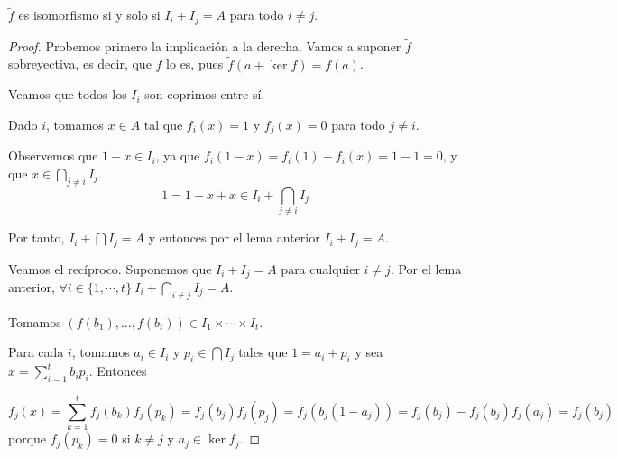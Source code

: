 \begin{teo}
  \(\tilde{f}\) es isomorfismo si y solo si
  \(I_i+I_j=A\) para todo \(i\neq j\).
\end{teo}
\begin{proof}
  Probemos primero la implicación a la derecha. Vamos a suponer \(\tilde{f}\) sobreyectiva, es decir, que \(f\) lo es, 
  pues \(\tilde{f}(a + \ker{f}) = f(a)\).
  
  Veamos que todos los \(I_i\) son coprimos entre sí.

  Dado \(i\), tomamos \(x\in A\) tal que \(f_i(x)=1\) y
  \(f_j(x)=0\) para todo \(j\neq i\).

  Observemos que \(1-x\in I_i\), ya que \(f_i(1-x) = f_i(1) - f_i(x) = 
  1 - 1 = 0\), y que \(x\in\bigcap_{j\neq i} I_j\).
  \[
    1=1-x+x \in I_i+\bigcap_{j\neq i} I_j
  \]

  Por tanto, \(I_i+\bigcap I_j =A\) y entonces por el lema anterior
  \(I_i+I_j=A\).
  
  Veamos el recíproco.
  Suponemos que \(I_i+I_j=A\) para cualquier \(i\neq j\). Por el lema
  anterior, \(\forall i \in \{1, \cdots, t\} \ I_i + \bigcap_{i \neq j} I_j = A\).

  Tomamos \((f(b_1),\ldots,f(b_t))\in I_1\times\cdots\times I_t\).

  Para cada \(i\), tomamos \(a_i\in I_i\) y \(p_i\in\bigcap I_j\) tales que
  \(1=a_i+p_i\) y sea \(x=\sum_{i=1}^t b_i p_i\). Entonces

  \[
    f_j(x)=\sum_{k=1}^t f_j(b_k) f_j(p_k)=f_j(b_j)f_j(p_j)=f_j(b_j(1-a_j))
    =f_j(b_j)-f_j(b_j)f_j(a_j)=f_j(b_j)
  \]
  porque \(f_j(p_k)=0\) si \(k\neq j\) y \(a_j\in\ker f_j\).

\end{proof}
